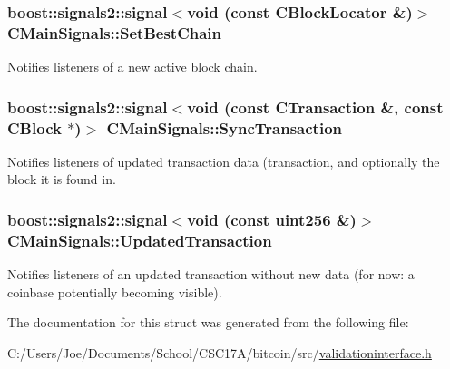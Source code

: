 \subsubsection[{Set\+Best\+Chain}]{\setlength{\rightskip}{0pt plus 5cm}boost\+::signals2\+::signal$<$void (const C\+Block\+Locator \&)$>$ C\+Main\+Signals\+::\+Set\+Best\+Chain}\label{struct_c_main_signals_a11f2f18522ff7aa672eb5cc8c1f397b2}
Notifies listeners of a new active block chain. \hypertarget{struct_c_main_signals_a7ced7f332ed90d57110a78ad50d5a60f}{}
\subsubsection[{Sync\+Transaction}]{\setlength{\rightskip}{0pt plus 5cm}boost\+::signals2\+::signal$<$void (const C\+Transaction \&, const C\+Block $\ast$)$>$ C\+Main\+Signals\+::\+Sync\+Transaction}\label{struct_c_main_signals_a7ced7f332ed90d57110a78ad50d5a60f}
Notifies listeners of updated transaction data (transaction, and optionally the block it is found in. \hypertarget{struct_c_main_signals_a460e5e468e8e4a9493fe1685b77c57e0}{}
\subsubsection[{Updated\+Transaction}]{\setlength{\rightskip}{0pt plus 5cm}boost\+::signals2\+::signal$<$void (const {\bf uint256} \&)$>$ C\+Main\+Signals\+::\+Updated\+Transaction}\label{struct_c_main_signals_a460e5e468e8e4a9493fe1685b77c57e0}
Notifies listeners of an updated transaction without new data (for now\+: a coinbase potentially becoming visible). 

The documentation for this struct was generated from the following file\+:\begin{DoxyCompactItemize}
\item 
C\+:/\+Users/\+Joe/\+Documents/\+School/\+C\+S\+C17\+A/bitcoin/src/\hyperlink{validationinterface_8h}{validationinterface.\+h}\end{DoxyCompactItemize}
